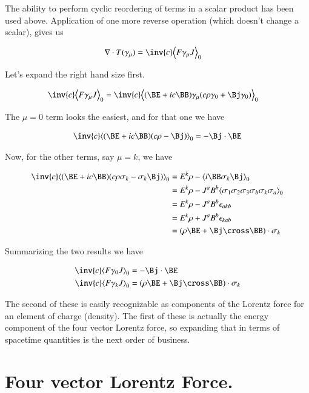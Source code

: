 The ability to perform cyclic reordering of terms in a scalar product has been used above.  Application of one more
reverse operation (which doesn't change a scalar), gives us

\begin{align}
\grad \cdot T(\gamma_\mu) &= \inv{c} \gpgradezero{ F \gamma_\mu J } 
\end{align}

Let's expand the right hand size first.

\begin{align*}
\inv{c} \gpgradezero{ F \gamma_\mu J } &= \inv{c} \gpgradezero{ (\BE + i c \BB) \gamma_\mu (c \rho \gamma_0 + \Bj \gamma_0) } 
\end{align*}

The $\mu = 0$ term looks the easiest, and for that one we have

\begin{align*}
\inv{c} \gpgradezero{ (\BE + i c \BB) (c \rho - \Bj) }  = -\Bj \cdot \BE
\end{align*}

Now, for the other terms, say $\mu = k$, we have

\begin{align*}
\inv{c} \gpgradezero{ (\BE + i c \BB) (c \rho \sigma_k - \sigma_k \Bj ) } 
&= E^k \rho - \gpgradezero{ i \BB \sigma_k \Bj }  \\
&= E^k \rho - J^a B^b \gpgradezero{ \sigma_1 \sigma_2 \sigma_3 \sigma_b \sigma_k \sigma_a }  \\
&= E^k \rho - J^a B^b \epsilon_{a k b} \\
&= E^k \rho + J^a B^b \epsilon_{k a b} \\
&= (\rho \BE + \Bj \cross \BB) \cdot \sigma_k
\end{align*}

Summarizing the two results we have

\begin{align}
\inv{c} \gpgradezero{ F \gamma_0 J } &= -\Bj \cdot \BE \\
\inv{c} \gpgradezero{ F \gamma_k J } &= (\rho \BE + \Bj \cross \BB) \cdot \sigma_k
\end{align}

The second of these is easily recognizable as components of the Lorentz force for an element of charge (density).  The first
of these is actually the energy component of the four vector Lorentz force, so expanding that in terms of spacetime quantities
is the next order of business.

\section{Four vector Lorentz Force. }

